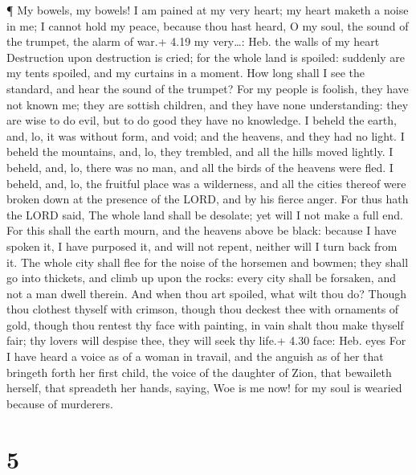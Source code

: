 ¶ My bowels, my bowels! I am pained at my very heart; my
heart maketh a noise in me; I cannot hold my peace, because thou hast
heard, O my soul, the sound of the trumpet, the alarm of war.+ 4.19 my
very\ldots: Heb. the walls of my heart  Destruction upon
destruction is cried; for the whole land is spoiled: suddenly are my
tents spoiled, and my curtains in a moment.  How long shall
I see the standard, and hear the sound of the trumpet?  For
my people is foolish, they have not known me; they are sottish children,
and they have none understanding: they are wise to do evil, but to do
good they have no knowledge.  I beheld the earth, and, lo,
it was without form, and void; and the heavens, and they had no light.
 I beheld the mountains, and, lo, they trembled, and all
the hills moved lightly.  I beheld, and, lo, there was no
man, and all the birds of the heavens were fled.  I beheld,
and, lo, the fruitful place was a wilderness, and all the cities thereof
were broken down at the presence of the LORD, and by his fierce anger.
 For thus hath the LORD said, The whole land shall be
desolate; yet will I not make a full end.  For this shall
the earth mourn, and the heavens above be black: because I have spoken
it, I have purposed it, and will not repent, neither will I turn back
from it.  The whole city shall flee for the noise of the
horsemen and bowmen; they shall go into thickets, and climb up upon the
rocks: every city shall be forsaken, and not a man dwell therein.
 And when thou art spoiled, what wilt thou do? Though thou
clothest thyself with crimson, though thou deckest thee with ornaments
of gold, though thou rentest thy face with painting, in vain shalt thou
make thyself fair; thy lovers will despise thee, they will seek thy
life.+ 4.30 face: Heb. eyes  For I have heard a voice as of
a woman in travail, and the anguish as of her that bringeth forth her
first child, the voice of the daughter of Zion, that bewaileth herself,
that spreadeth her hands, saying, Woe is me now! for my soul is wearied
because of murderers.

\hypertarget{section-4}{%
\section{5}\label{section-4}}

